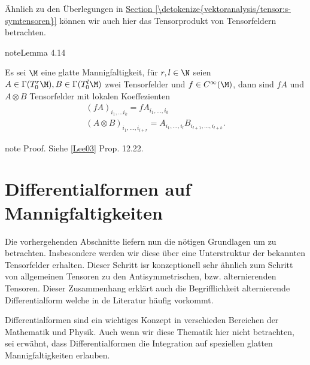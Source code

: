 \documentclass[letterpaper,10pt,english]{jupyterBook}
\begin{document}
\sphinxAtStartPar
Ähnlich zu den Überlegungen in \hyperref[\detokenize{vektoranalysis/tensor:s-symtensoren}]{Section \ref{\detokenize{vektoranalysis/tensor:s-symtensoren}}} können wir auch hier das Tensorprodukt von Tensorfeldern betrachten.
\label{manifolds/tangential:lemma-47}
\begin{sphinxadmonition}{note}{Lemma 4.14}



\sphinxAtStartPar
Es sei \(\M\) eine glatte Mannigfaltigkeit, für \(r,l\in \N\) seien \(A\in \Gamma(T^r_0\M), B\in \Gamma(T^l_0\M)\) zwei Tensorfelder und \(f\in C^\infty(\M)\), dann sind \(fA\) und \(A\otimes B\) Tensorfelder mit lokalen Koeffezienten
\begin{equation*}
\begin{split}(fA)_{i_1,\ldots i_{k}} = f A_{i_1,\ldots, i_k}\\
(A\otimes B)_{i_1,\ldots,i_{l+r}} = A_{i_1,\ldots, i_l} B_{i_{l+1},\ldots, i_{l+k}}.\end{split}
\end{equation*}\end{sphinxadmonition}

\begin{sphinxadmonition}{note}
\sphinxAtStartPar
Proof. Siehe {[}\hyperlink{cite.references:id15}{Lee03}{]} Prop. 12.22.
\end{sphinxadmonition}


\section{Differentialformen auf Mannigfaltigkeiten}
\label{\detokenize{manifolds/diffformen:differentialformen-auf-mannigfaltigkeiten}}\label{\detokenize{manifolds/diffformen::doc}}
\sphinxAtStartPar
Die vorhergehenden Abschnitte liefern nun die nötigen Grundlagen um  zu betrachten. Insbesondere werden wir diese über eine Unterstruktur der bekannten Tensorfelder erhalten. Dieser Schritt isr konzeptionell sehr ähnlich zum Schritt von allgemeinen Tensoren zu den Antisymmetrischen, bzw. alternierenden Tensoren. Dieser Zusammenhang erklärt auch die Begrifflichkeit alternierende Differentialform welche in de Literatur häufig vorkommt.

\sphinxAtStartPar
Differentialformen sind ein wichtiges Konzept in verschieden Bereichen der Mathematik und Physik. Auch wenn wir diese Thematik hier nicht betrachten, sei erwähnt, dass Differentialformen die Integration auf speziellen glatten Mannigfaltigkeiten erlauben.
\end{document}
